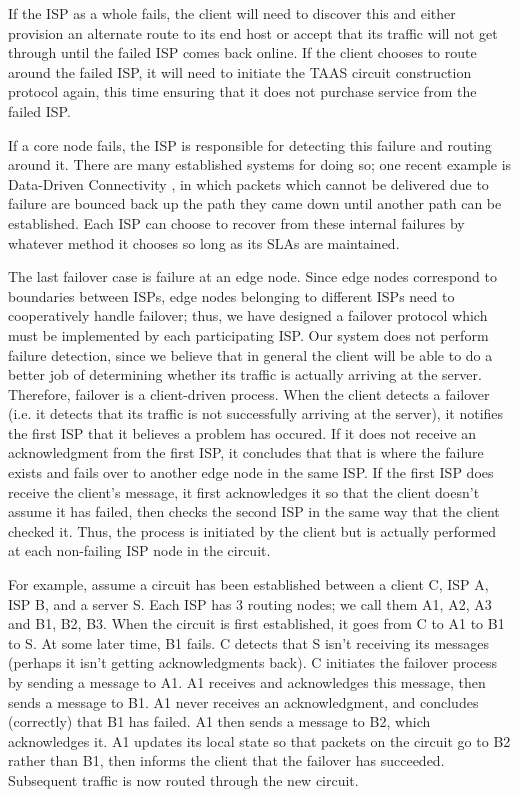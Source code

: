 \documentclass{article}
\begin{document}
If the ISP as a whole fails, the client will need to discover this and
either provision an alternate route to its end host or accept that its
traffic will not get through until the failed ISP comes back
online. If the client chooses to route around the failed ISP, it will
need to initiate the TAAS circuit construction protocol again, this
time ensuring that it does not purchase service from the failed ISP.

If a core node fails, the ISP is responsible for detecting this
failure and routing around it. There are many established systems for
doing so; one recent example is Data-Driven Connectivity \cite{ddc},
in which packets which cannot be delivered due to failure are bounced
back up the path they came down until another path can be
established. Each ISP can choose to recover from these internal
failures by whatever method it chooses so long as its SLAs are
maintained.

The last failover case is failure at an edge node. Since edge nodes
correspond to boundaries between ISPs, edge nodes belonging to
different ISPs need to cooperatively handle failover; thus, we have
designed a failover protocol which must be implemented by each
participating ISP.  Our system does not perform failure detection,
since we believe that in general the client will be able to do a
better job of determining whether its traffic is actually arriving at
the server. Therefore, failover is a client-driven process. When the
client detects a failover (i.e. it detects that its traffic is not
successfully arriving at the server), it notifies the first ISP that
it believes a problem has occured. If it does not receive an
acknowledgment from the first ISP, it concludes that that is where the
failure exists and fails over to another edge node in the same ISP. If
the first ISP does receive the client's message, it first acknowledges
it so that the client doesn't assume it has failed, then checks the
second ISP in the same way that the client checked it. Thus, the
process is initiated by the client but is actually performed at each
non-failing ISP node in the circuit.

For example, assume a circuit has been established between a client C,
ISP A, ISP B, and a server S. Each ISP has 3 routing nodes; we call
them A1, A2, A3 and B1, B2, B3. When the circuit is first established,
it goes from C to A1 to B1 to S. At some later time, B1 fails. C
detects that S isn't receiving its messages (perhaps it isn't getting
acknowledgments back). C initiates the failover process by sending a
message to A1. A1 receives and acknowledges this message, then sends a
message to B1. A1 never receives an acknowledgment, and concludes
(correctly) that B1 has failed. A1 then sends a message to B2, which
acknowledges it. A1 updates its local state so that packets on the
circuit go to B2 rather than B1, then informs the client that the
failover has succeeded. Subsequent traffic is now routed through the
new circuit.
\end{document}
